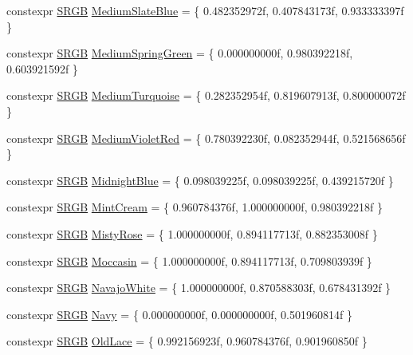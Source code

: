 \begin{DoxyCompactItemize}
\item 
constexpr \hyperlink{structmage_1_1_s_r_g_b}{S\+R\+GB} \hyperlink{namespacemage_1_1color_a8d7f9b57c4ef5b5f79eb2c73ec399195}{Medium\+Slate\+Blue} = \{ 0.\+482352972f, 0.\+407843173f, 0.\+933333397f \}
\item 
constexpr \hyperlink{structmage_1_1_s_r_g_b}{S\+R\+GB} \hyperlink{namespacemage_1_1color_ac6e9e1bbaaf7e34c678be9b8f7dda59f}{Medium\+Spring\+Green} = \{ 0.\+000000000f, 0.\+980392218f, 0.\+603921592f \}
\item 
constexpr \hyperlink{structmage_1_1_s_r_g_b}{S\+R\+GB} \hyperlink{namespacemage_1_1color_ad4892535dcd05ab34c077e27406edff4}{Medium\+Turquoise} = \{ 0.\+282352954f, 0.\+819607913f, 0.\+800000072f \}
\item 
constexpr \hyperlink{structmage_1_1_s_r_g_b}{S\+R\+GB} \hyperlink{namespacemage_1_1color_aabc2a8abdf89ae4494df5f6973421ce1}{Medium\+Violet\+Red} = \{ 0.\+780392230f, 0.\+082352944f, 0.\+521568656f \}
\item 
constexpr \hyperlink{structmage_1_1_s_r_g_b}{S\+R\+GB} \hyperlink{namespacemage_1_1color_af95cf1f370d9009ad1441d944e9b0cbf}{Midnight\+Blue} = \{ 0.\+098039225f, 0.\+098039225f, 0.\+439215720f \}
\item 
constexpr \hyperlink{structmage_1_1_s_r_g_b}{S\+R\+GB} \hyperlink{namespacemage_1_1color_a970786ca4973ba03a297331e517fab11}{Mint\+Cream} = \{ 0.\+960784376f, 1.\+000000000f, 0.\+980392218f \}
\item 
constexpr \hyperlink{structmage_1_1_s_r_g_b}{S\+R\+GB} \hyperlink{namespacemage_1_1color_a56bd7d93171c5b2b37db31ac93faf217}{Misty\+Rose} = \{ 1.\+000000000f, 0.\+894117713f, 0.\+882353008f \}
\item 
constexpr \hyperlink{structmage_1_1_s_r_g_b}{S\+R\+GB} \hyperlink{namespacemage_1_1color_a7a4d383ae38d238a02a8c21c0919ebf2}{Moccasin} = \{ 1.\+000000000f, 0.\+894117713f, 0.\+709803939f \}
\item 
constexpr \hyperlink{structmage_1_1_s_r_g_b}{S\+R\+GB} \hyperlink{namespacemage_1_1color_a202ec8025686185d9f389c91abddb72a}{Navajo\+White} = \{ 1.\+000000000f, 0.\+870588303f, 0.\+678431392f \}
\item 
constexpr \hyperlink{structmage_1_1_s_r_g_b}{S\+R\+GB} \hyperlink{namespacemage_1_1color_ac30ea52200abf8c5a69628560ae8016a}{Navy} = \{ 0.\+000000000f, 0.\+000000000f, 0.\+501960814f \}
\item 
constexpr \hyperlink{structmage_1_1_s_r_g_b}{S\+R\+GB} \hyperlink{namespacemage_1_1color_abe3c9722c3cbab17e0d3890dd32bd93e}{Old\+Lace} = \{ 0.\+992156923f, 0.\+960784376f, 0.\+901960850f \}

\end{DoxyCompactItemize}
